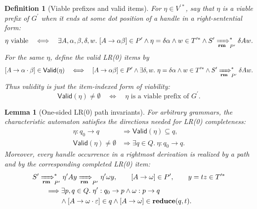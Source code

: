 \documentclass[11pt,a4paper]{article}
\theoremstyle{prettyplain}
\newtheorem{lemma}[theorem]{Lemma}
\theoremstyle{prettydef}
\newtheorem{definition}[theorem]{Definition}
\newcommand{\eps}{\varepsilon}
\newcommand{\RMP}{\xRightarrow[\mathbf{rm}]{}_{P^\prime}}
\newcommand{\Path}[3]{#1:#2\to#3}
\newcommand{\Item}[2]{[#1\to #2]}
\newcommand{\Reduce}{\mathbf{reduce}}
\begin{document}
\begin{definition}[Viable prefixes and valid items]\label{def:viable-valid}
For \(\eta\in V^{\prime *}\), say that \(\eta\) is a \emph{viable prefix} of
\(G^\prime\) when it ends at some dot position of a handle in a right-sentential
form:
\begin{equation}\label{eq:vp-def}
\eta\text{ viable}
\quad\Longleftrightarrow\quad
\exists A,\alpha,\beta,\delta,w.\
\Item{A}{\alpha\beta}\in P^\prime
\land
\eta=\delta\alpha
\land
w\in T^{\prime *}
\land
S^\prime\RMP^*\delta A w .
\end{equation}
For the same \(\eta\), define the valid LR(0) items by
\begin{equation}\label{eq:valid-def}
\Item{A}{\alpha\cdot\beta}\in\mathsf{Valid}(\eta)
\quad\Longleftrightarrow\quad
\Item{A}{\alpha\beta}\in P^\prime
\land
\exists\delta,w.\
\eta=\delta\alpha
\land
w\in T^{\prime *}
\land
S^\prime\RMP^*\delta A w .
\end{equation}
Thus validity is just the item-indexed form of viability:
\begin{equation}\label{eq:valid-vp}
\mathsf{Valid}(\eta)\ne\emptyset
\quad\Longleftrightarrow\quad
\eta\text{ is a viable prefix of }G^\prime .
\end{equation}
\end{definition}

\begin{lemma}[One-sided LR(0) path invariants]\label{lem:lra-path-invariants}
For arbitrary grammars, the characteristic automaton satisfies the directions
needed for LR(0) completeness:
\begin{align}
\Path{\eta}{q_0}{q}
&\Longrightarrow
\mathsf{Valid}(\eta)\subseteq q, \label{eq:valid-sub-state}\\[2pt]
\mathsf{Valid}(\eta)\ne\emptyset
&\Longrightarrow
\exists q\in Q.\ \Path{\eta}{q_0}{q}. \label{eq:viable-implies-path}
\end{align}
Moreover, every handle occurrence in a rightmost derivation is realized by a path
and by the corresponding completed LR(0) item:
\begin{equation}\label{eq:handle}
\begin{aligned}
& S^\prime\RMP^*\eta^\prime A y
  \RMP
  \eta^\prime\omega y,
  \qquad
  \Item{A}{\omega}\in P^\prime,
  \qquad
  y=t z\in T^{\prime *} \\
&\qquad\Longrightarrow
\exists p,q\in Q.\;
\Path{\eta^\prime}{q_0}{p}
\land
\Path{\omega}{p}{q} \\
&\qquad\qquad\land
\Item{A}{\omega\cdot\eps}\in q
\land
\Item{A}{\omega}\in\Reduce(q,t).
\end{aligned}
\end{equation}
\end{lemma}
\end{document}
